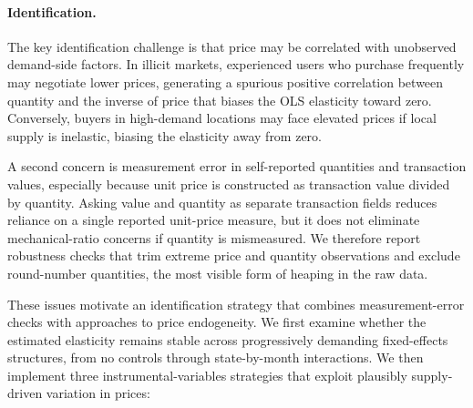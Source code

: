 \paragraph{Identification.}
The key identification challenge is that price may be correlated with unobserved demand-side factors.  In illicit markets, experienced users who purchase frequently may negotiate lower prices, generating a spurious positive correlation between quantity and the inverse of price that biases the OLS elasticity toward zero.  Conversely, buyers in high-demand locations may face elevated prices if local supply is inelastic, biasing the elasticity away from zero.

A second concern is measurement error in self-reported quantities and transaction values, especially because unit price is constructed as transaction value divided by quantity.  Asking value and quantity as separate transaction fields reduces reliance on a single reported unit-price measure, but it does not eliminate mechanical-ratio concerns if quantity is mismeasured.  We therefore report robustness checks that trim extreme price and quantity observations and exclude round-number quantities, the most visible form of heaping in the raw data.

These issues motivate an identification strategy that combines measurement-error checks with approaches to price endogeneity.  We first examine whether the estimated elasticity remains stable across progressively demanding fixed-effects structures, from no controls through state-by-month interactions.  We then implement three instrumental-variables strategies that exploit plausibly supply-driven variation in prices:

